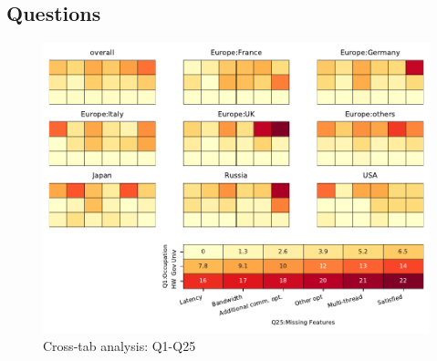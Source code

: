 
\subsection{Questions}


\begin{figure}
\begin{center}
\includegraphics[width=12cm]{../pdfs/Q1-Q25.pdf}
\caption{Cross-tab analysis: Q1-Q25}
\label{fig:Q1-Q25}
\end{center}
\end{figure}
